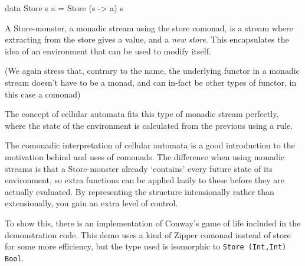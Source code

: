 \begin{haskell}
data Store s a = Store (s -> a) s
\end{haskell}

A Store-monster, a monadic stream using the store comonad, is a stream where extracting from the store gives a value, and a \emph{new store}. This encapsulates the idea of an environment that can be used to modify itself. 

(We again stress that, contrary to the name, the underlying functor in a monadic stream doesn't have to be a monad, and can in-fact be other types of functor, in this case a comonad) 

The concept of cellular automata \cite{cellular_automata} fits this type of monadic stream perfectly, where the state of the environment is calculated from the previous using a rule. 

The comonadic interpretation of cellular automata \cite{dan_piponi_CA} is a good introduction to the motivation behind and uses of comonads. The difference when using monadic streams is that a Store-monster already `contains' every future state of its environment, so extra functions can be applied lazily to these before they are actually evaluated. By representing the structure intensionally rather than extensionally, you gain an extra level of control.

To show this, there is an implementation of Conway's game of life included in the demonstration code. This demo uses a kind of Zipper comonad \cite{huet_zipper} instead of store for some more efficiency, but the type used is isomorphic to \verb+Store (Int,Int) Bool+.
